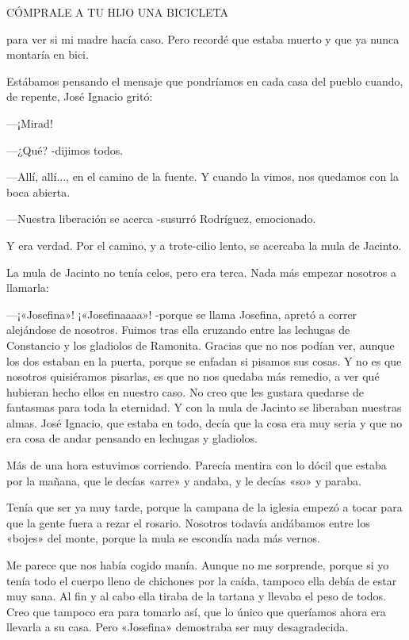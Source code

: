 \documentclass{barcodevapor3pags}
\begin{document}
\begin{center}CÓMPRALE A TU HIJO UNA BICICLETA\end{center}



para ver si mi madre hacía caso. Pero recordé que estaba muerto y que ya
nunca montaría en bici.

Estábamos pensando el mensaje que pondríamos en cada casa del pueblo
cuando, de repente, José Ignacio gritó:~

---¡Mirad!~

---¿Qué? -dijimos todos.~

---Allí, allí..., en el camino de la fuente. Y cuando la vimos, nos
quedamos con la boca abierta.~

---Nuestra liberación se acerca -susurró Rodríguez, emocionado.~

Y era verdad. Por el camino, y a trote-cilio lento, se acercaba la mula
de Jacinto.




\capitulo
{\Large L}a mula de Jacinto no tenía celos, pero era terca. Nada más empezar
nosotros a llamarla:

---¡«Josefina»! ¡«Josefinaaaa»! -porque se llama Josefina, apretó a
correr alejándose de nosotros. Fuimos tras ella cruzando entre las
lechugas de Constancio y los gladiolos de Ramonita. Gracias que no nos
podían ver, aunque los dos estaban en la puerta, porque se enfadan si
pisamos sus cosas. Y no es que nosotros quisiéramos pisarlas, es que no
nos quedaba más remedio, a ver qué hubieran hecho ellos en nuestro caso.
No creo que les gustara quedarse de fantasmas para toda la eternidad. Y
con la mula de Jacinto se liberaban nuestras almas. José Ignacio, que
estaba en todo, decía que la cosa era muy seria y que no era cosa de
andar pensando en lechugas y gladiolos.~

Más de una hora estuvimos corriendo. Parecía mentira con lo dócil que
estaba por la mañana, que le decías «arre» y andaba, y le decías «so» y
paraba.~

Tenía que ser ya muy tarde, porque la campana de la iglesia empezó a
tocar para que la gente fuera a rezar el rosario. Nosotros todavía
andábamos entre los «bojes» del monte, porque la mula se escondía nada
más vernos.~

Me parece que nos había cogido manía. Aunque no me sorprende, porque si
yo tenía todo el cuerpo lleno de chichones por la caída, tampoco ella
debía de estar muy sana. Al fin y al cabo ella tiraba de la tartana y
llevaba el peso de todos. Creo que tampoco era para tomarlo así, que lo
único que queríamos ahora era llevarla a su casa. Pero «Josefina»
demostraba ser muy desagradecida.~
\end{document}
